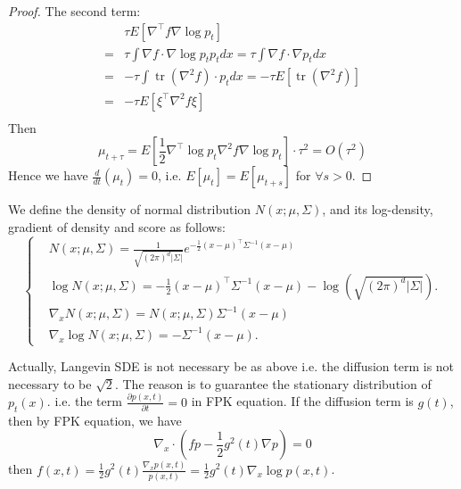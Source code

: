\begin{proof}
The second term:
\begin{equation}
    \begin{aligned}
        &\tau E\left[\nabla^{\top} f \nabla \log p_{t}\right] \\
        =&\tau \int \nabla f \cdot \nabla \log p_{t} p_{t} d x=\tau \int \nabla f \cdot \nabla p_{t} d x \\
        =&-\tau \int \operatorname{tr}\left(\nabla^{2} f\right) \cdot p_{t} d x=-\tau E\left[\operatorname{tr}\left(\nabla^{2} f\right)\right]\\
        =&-\tau E\left[\xi^{\top} \nabla^{2} f \xi\right] \\
    \end{aligned}
\end{equation}
Then 
\begin{equation}
    \mu_{t+\tau} =E\left[\frac{1}{2} \nabla^{\top} \log p_{t} \nabla^{2} f \nabla \log p_{t}\right] \cdot \tau^{2}=O\left(\tau^{2}\right)
\end{equation}
Hence we have $\frac{d}{dt}(\mu_t)=0$, i.e. $E[\mu_t]=E[\mu_{t+s}]$ for $\forall s>0$.
\end{proof}

\begin{remark}
    We define the density of normal distribution $N(x ; \mu, \Sigma)$, and its log-density, gradient of density and score as follows:
    \begin{equation}\left\{
        \begin{aligned}
            &N(x ; \mu, \Sigma)=\frac{1}{\sqrt{(2 \pi)^{d}|\Sigma|}} e^{-\frac{1}{2}(x-\mu)^{\top} \Sigma^{-1}(x-\mu)}\\
            &\log N(x ; \mu, \Sigma)=-\frac{1}{2}(x-\mu)^{\top} \Sigma^{-1}(x-\mu)-\log \left(\sqrt{(2 \pi)^{d}|\Sigma|}\right) . \\
            &\nabla_{x} N(x ; \mu, \Sigma)=N(x ; \mu, \Sigma)\Sigma^{-1}(x-\mu) \\
            &\nabla_{x} \log N(x ; \mu, \Sigma)=-\Sigma^{-1}(x-\mu) .
        \end{aligned}\right.
    \end{equation}
\end{remark}

Actually, Langevin SDE is not necessary be as above i.e. the diffusion term is not necessary to be $\sqrt{2}$. The reason is to guarantee the stationary distribution of $p_t(x)$.
i.e. the term $\frac{\partial p(x,t)}{\partial t}=0$ in FPK equation. If the diffusion term is $g(t)$, then by FPK equation, we have 
$$\nabla_x\cdot(fp-\frac{1}{2}g^2(t)\nabla p)=0$$
then $f(x,t) = \frac{1}{2}g^2(t)\frac{\nabla_x p(x, t)}{p(x,t)}=\frac{1}{2}g^2(t)\nabla_x\log p(x, t)$.

